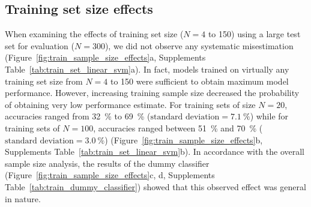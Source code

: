 \documentclass[12pt,a4paper]{article}
\begin{document}
    \subsection{Training set size effects}
    When examining the effects of training set size ($N=\num{4}$ to \num{150}) using a large test set for evaluation ($N=\num{300}$), we did not observe any systematic misestimation (Figure~\ref{fig:train_sample_size_effects}a, Supplements Table~\ref{tab:train_set_linear_svm}a). In fact, models trained on virtually any training set size from $N=\num{4}$ to \num{150} were sufficient to obtain maximum model performance. However, increasing training sample size decreased the probability of obtaining very low performance estimate. For training sets of size $N=\num{20}$, accuracies ranged from \SI{32}{\percent} to \SI{69}{\percent} ($\text{standard deviation}=\SI{7.1}{\percent}$) while for training sets of $N=100$, accuracies ranged between \SI{51}{\percent} and \SI{70}{\percent} ($\text{standard deviation}=\SI{3.0}{\percent}$) (Figure~\ref{fig:train_sample_size_effects}b, Supplements Table~\ref{tab:train_set_linear_svm}b). In accordance with the overall sample size analysis, the results of the dummy classifier (Figure~\ref{fig:train_sample_size_effects}c, d, Supplements Table~\ref{tab:train_dummy_classifier}) showed that this observed effect was general in nature.
\end{document}
